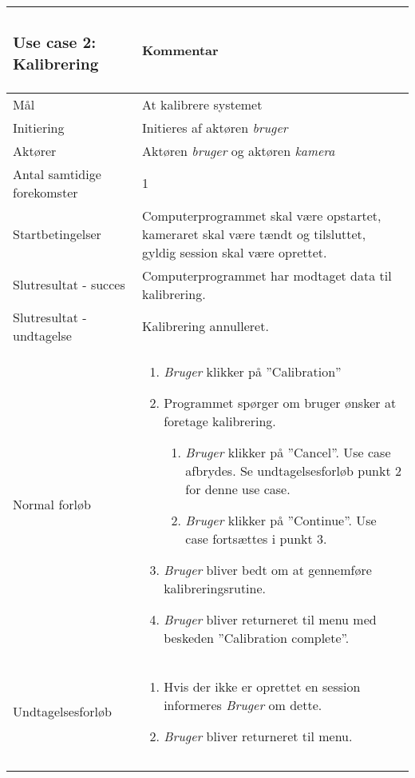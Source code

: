 \documentclass[kravspec.tex]{subfiles}
\begin{document}
\begin{tabular}{|l|p{7.7cm}|}
	\subsubsection{Use case 2: Kalibrering}
	\begin{}{|l|p{7.7cm}|}
		\hline \textbf{Sektion} & \textbf{Kommentar} \\ 
		\hline Mål & At kalibrere systemet \\ 
		\hline Initiering & Initieres af aktøren \textit{bruger} \\ 
		\hline Aktører & Aktøren \textit{bruger} og aktøren \textit{kamera} \\ 
		\hline Antal samtidige forekomster & 1 \\ 
		\hline Startbetingelser & Computerprogrammet skal være opstartet, kameraret skal være tændt og tilsluttet, gyldig session skal være oprettet. \\ 	
		\hline Slutresultat - succes & Computerprogrammet har modtaget data til kalibrering. \\ 
		\hline Slutresultat - undtagelse &  Kalibrering annulleret. \\ 
		\hline Normal forløb & \begin{enumerate}
			\item \textit{Bruger} klikker på ”Calibration”
			\item Programmet spørger om bruger ønsker at foretage kalibrering.
			\begin{enumerate}
				\item \textit{Bruger} klikker på ”Cancel”.
				Use case afbrydes.
				Se undtagelsesforløb punkt 2 for denne use case.
				\item \textit{Bruger} klikker på ”Continue”. 
				Use case fortsættes i punkt 3.
			\end{enumerate}
			\item \textit{Bruger} bliver bedt om at gennemføre kalibreringsrutine.
			\item \textit{Bruger} bliver returneret til menu med beskeden ”Calibration complete”.

		\end{enumerate} \\ 
		\hline Undtagelsesforløb & \begin{enumerate}
			\item Hvis der ikke er oprettet en session informeres \textit{Bruger} om dette.
			\item \textit{Bruger} bliver returneret til menu.
		\end{enumerate}  \\ 
		\hline 
	\end{} \\ \\
	

\end{tabular}
\end{document}
